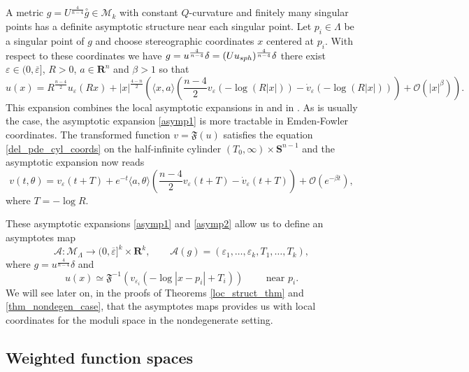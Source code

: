 \documentclass[reqno,11pt]{amsart}
\theoremstyle{tttheorem}
\newcommand{\Ss}{\mathbf{S}}
\newcommand{\R}{\mathbf{R}}
\begin{document}
A metric $g=U^{\frac{4}{n-4}} \overset{\circ}{g} \in \mathcal{M}_k$ 
with constant $Q$-curvature and finitely many singular points has a 
definite asymptotic structure near each singular point. Let $p_i \in 
\Lambda$ be a singular point of $g$ and choose stereographic coordinates 
$x$ centered at $p_i$. With respect to these coordinates we have 
$g = u^{\frac{4}{n-4}} \delta = (Uu_{\rm sph})^{\frac{4}{n-4}} \delta$ 
there exist $\varepsilon \in (0,\overline{\varepsilon}]$, $R>0$, 
$a \in \R^n$ and $\beta >1$ so that
\begin{equation} \label{asymp1}
u(x) = R^{\frac{n-4}{2}}u_\varepsilon(Rx) + |x|^{\frac{4-n}{2}} \left ( 
\langle x,a \rangle \left ( \frac{n-4}{2} v_\varepsilon (-\log (R|x|))-\dot v_\varepsilon (-\log (R|x|)) 
 \right ) + \mathcal{O}(|x|^\beta) 
\right ) .\end{equation} 
This expansion combines the local asymptotic expansions in \cite{JX} and 
in \cite{jesse2020}. 
As is usually the case, the asymptotic expansion \eqref{asymp1} is more 
tractable in Emden-Fowler coordinates. The transformed function $v=\mathfrak{F}(u)$ 
satisfies the equation \eqref{del_pde_cyl_coords} on the 
half-infinite cylinder $(T_0,\infty) \times \Ss^{n-1}$ and the asymptotic 
expansion now reads 
\begin{equation} \label{asymp2}
v(t,\theta) = v_\varepsilon (t+T) + e^{-t} \langle a,\theta\rangle \left ( 
\frac{n-4}{2} v_\varepsilon(t+T)-\dot v_\varepsilon(t+T)\right ) 
+ \mathcal{O}(e^{-\beta t}), \end{equation}
where $T= -\log R$. 

These asymptotic expansions \eqref{asymp1} and \eqref{asymp2} allow 
us to define an asymptotes map
\begin{equation} \label{defn_asymp_map1}
\mathcal{A}: \mathcal{M}_\Lambda \rightarrow (0,\overline{\varepsilon}]^k 
\times \R^k, \qquad \mathcal{A}(g) = (\varepsilon_1, \dots, \varepsilon_k, T_1,
\dots, T_k), 
\end{equation} 
where $g = u^{\frac{4}{n-4}} \delta$ and 
\begin{equation} \label{defn_asymp_map2} 
u(x) \simeq \mathfrak{F}^{-1} (v_{\varepsilon_i} (-\log |x-p_i| + T_i)) 
\qquad \textrm{ near }p_i.
\end{equation} 
We will see later on, in the proofs of Theorems \ref{loc_struct_thm} and \ref{thm_nondegen_case}, 
that the asymptotes maps provides us with local coordinates for the 
moduli space in the nondegenerate setting. 

\subsection{Weighted function spaces}
\end{document}
